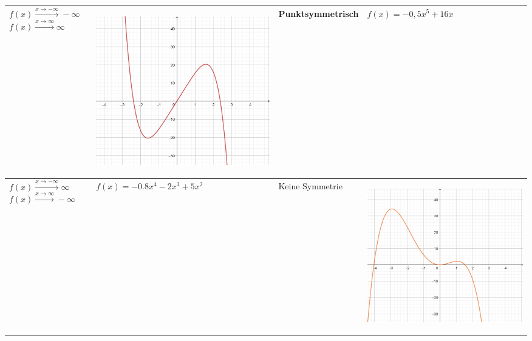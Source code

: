 \documentclass[oneside,openany,headings=optiontotoc,11pt,numbers=noenddot]{scrreprt}
\begin{document}
	\newpage
	\begin{table}
		\begin{tabular}{|M{4.35cm}|M{4.35cm}||M{4.35cm}|M{4.25cm}|}
			\hline
			 &
			\begin{center}\includegraphics[scale=0.15]{04-GanzrationaleFunktionen/q1.jpg}\end{center} & Punktsymmetrisch & \(f(x)=-0,5x^5+16x\)  \\
			\hline
			 & \(f(x)=-0.8x^4 - 2x^3 + 5x^2 \)   & Keine Symmetrie & \begin{center}\includegraphics[scale=0.15]{04-GanzrationaleFunktionen/r1.jpg}\end{center}\\

\end{tabular}
\end{table}
\end{document}
